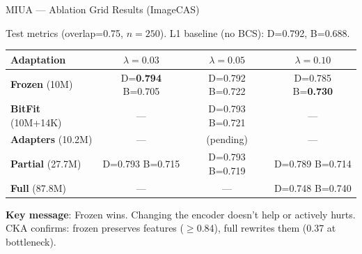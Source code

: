 \documentclass[aspectratio=169,10pt]{beamer}
\newcommand{\good}[1]{\textcolor{green!60!black}{\textbf{#1}}}
\newcommand{\bad}[1]{\textcolor{red!70!black}{#1}}
\begin{document}
\begin{frame}{MIUA --- Ablation Grid Results (ImageCAS)}

Test metrics (overlap=0.75, $n=250$). L1 baseline (no BCS): D=0.792, B=0.688.

\vspace{0.2cm}
\centering
\begin{tabular}{l c c c}
\toprule
\textbf{Adaptation} & $\lambda=0.03$ & $\lambda=0.05$ & $\lambda=0.10$ \\
\midrule
\textbf{Frozen} (10M) & D=\good{0.794} B=0.705 & D=0.792 B=0.722 & D=0.785 B=\good{0.730} \\
\textbf{BitFit} (10M+14K) & --- & D=0.793 B=0.721 & --- \\
\textbf{Adapters} (10.2M) & --- & (pending) & --- \\
\textbf{Partial} (27.7M) & D=0.793 B=0.715 & D=0.793 B=0.719 & D=0.789 B=0.714 \\
\textbf{Full} (87.8M) & --- & --- & D=\bad{0.748} B=0.740 \\
\bottomrule
\end{tabular}

\vspace{0.3cm}
\textbf{Key message}: Frozen wins. Changing the encoder doesn't help or actively hurts.\\
CKA confirms: frozen preserves features ($\geq$0.84), full rewrites them (0.37 at bottleneck).

\end{frame}
\end{document}
